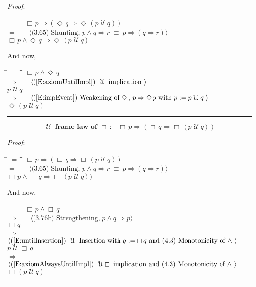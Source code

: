 \documentclass[12pt, fleqn, leqno]{article}
\newcommand{\lgap}{2pt}                             %
\newcommand{\mymathindent}{24pt}                    %
\newcommand{\equivs}{\ensuremath{\;\equiv\;}}       %
\newcommand{\impl}{\ensuremath{\Rightarrow}}        %
\newcommand{\Until}{\;\mathcal{U}\;}
\newcommand{\Event}{\Diamond\,}
\newcommand{\Always}{\Box\,}
\newcommand{\myqed}{\rule[-.23ex]{1.2ex}{2.0ex}}
\newcommand{\myqedtab}{\hspace{384pt}}              %
\newcommand{\Gll} {\langle}                         %
\newcommand{\Ggg} {\rangle}                         %
\newcommand{\Hint}[1]     {\ \ \ $\Gll              \mbox{#1} \Ggg$ }   %
\begin{document}
\emph{Proof}:
\begin{tabbing}
\hspace{\mymathindent} \= $= \;$ \= \myqedtab \= \kill
  \> \>   $\Always p \impl (\Event q \impl \Event (p \Until q))$\\[\lgap]
  \> $=$  \>  \Hint{(3.65) Shunting, $p\land q\impl r\equivs p\impl (q\impl r)$}\\[\lgap]
  \> \>   $\Always p \land \Event q \impl \Event (p \Until q)$
\end{tabbing}
And now,
\begin{tabbing}
\hspace{\mymathindent} \= $= \;$ \= \myqedtab \= \kill
  \> \>   $\Always p \land \Event q $\\[\lgap]
   \> $\impl$ \> \Hint{(\ref{E:axiomUntilImpl}) $\Until$ implication } \\[\lgap]
   \> \>   $p \Until q $\\[\lgap]
  \> $\impl$  \>  \Hint{(\ref{E:impEvent}) Weakening of $\Event$, $p \impl \Event p$ with $p := p \Until q$ }\\[\lgap]
  \> \>   $\Event (p \Until q) $\quad \myqed
\end{tabbing}
\begin{equation}\label{E:untilframelawAlways}
\textbf{$\Until$ frame law of $\Always$:}\quad \Always p \impl (\Always q \impl \Always (p \Until q))
\end{equation}

\emph{Proof}:
\begin{tabbing}
\hspace{\mymathindent} \= $= \;$ \= \myqedtab \= \kill
  \> \>   $\Always p \impl (\Always q \impl \Always (p \Until q))$\\[\lgap]
  \> $=$  \>  \Hint{(3.65) Shunting, $p\land q\impl r\equivs p\impl (q\impl r)$}\\[\lgap]
  \> \>   $\Always p \land \Always q \impl \Always (p \Until q))$
\end{tabbing}
And now,
\begin{tabbing}
\hspace{\mymathindent} \= $= \;$ \= \myqedtab \= \kill
  \> \>   $\Always p \land \Always q $\\[\lgap]
  \> $\impl$ \> \Hint{(3.76b) Strengthening, $p\land q \impl p$} \\[\lgap]
  \> \>   $\Always q $\\[\lgap]
  \> $\impl$ \> \Hint{(\ref{E:untilInsertion}) $\Until$ Insertion with $q:=\Always q$ and (4.3) Monotonicity of $\land$ } \\[\lgap]
  \> \>   $p \Until \Always q $\\[\lgap]
   \> $\impl$ \> \Hint{(\ref{E:axiomAlwaysUntilImpl}) $\Until\Always$ implication and (4.3) Monotonicity of $\land$  } \\[\lgap]
   \> \>   $\Always (p \Until  q) $\quad \myqed
\end{tabbing}
\end{document}
